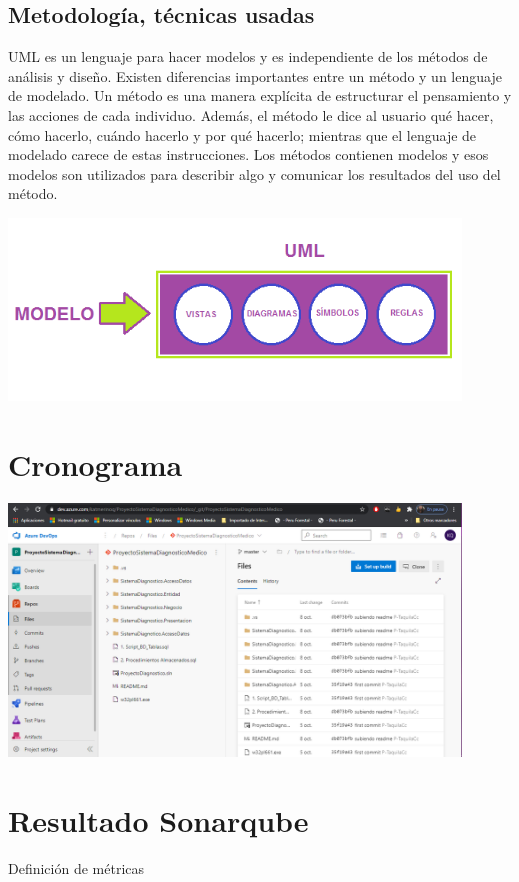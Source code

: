 \documentclass[preprint,12pt]{elsarticle}
\begin{document}
\subsection{\textbf{ Metodología, técnicas usadas  }}
UML es un lenguaje para hacer modelos y es independiente de los métodos de análisis y diseño. Existen diferencias importantes entre un método y un lenguaje de modelado. Un método es una manera explícita de estructurar el pensamiento y las acciones de cada individuo. Además, el método le dice al usuario qué hacer, cómo hacerlo, cuándo hacerlo y por qué hacerlo; mientras que el lenguaje de modelado carece de estas instrucciones. Los métodos contienen modelos y esos modelos son utilizados para describir algo y comunicar los resultados del uso del método.
          \begin{center}
	\includegraphics[width=12cm]{./imagen/5} 
	\end{center}
		
\section{Cronograma }

	\begin{center}
	\includegraphics[width=12cm]{./imagen/20} 
	\end{center}

\section{Resultado Sonarqube}
Definición de métricas
\end{document}
